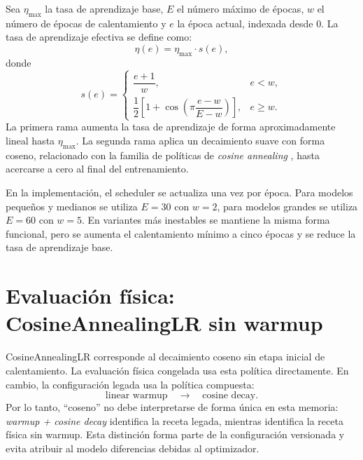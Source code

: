 Sea $\eta_{\max}$ la tasa de aprendizaje base, $E$ el número máximo de épocas, $w$ el número de épocas de calentamiento y $e$ la época actual, indexada desde $0$. La tasa de aprendizaje efectiva se define como:
\begin{equation}
    \eta(e)
    =
    \eta_{\max} \cdot s(e),
\end{equation}
donde
\begin{equation}
    s(e)
    =
    \begin{cases}
        \dfrac{e+1}{w}, & e < w, \\[8pt]
        \dfrac{1}{2}
        \left[
            1 + \cos\left(
                \pi
                \dfrac{e-w}{E-w}
            \right)
        \right],
        & e \geq w.
    \end{cases}
\end{equation}
La primera rama aumenta la tasa de aprendizaje de forma aproximadamente lineal hasta $\eta_{\max}$. La segunda rama aplica un decaimiento suave con forma coseno, relacionado con la familia de políticas de \emph{cosine annealing} \cite{loshchilov2017sgdr}, hasta acercarse a cero al final del entrenamiento.

En la implementación, el scheduler se actualiza una vez por época. Para modelos pequeños y medianos se utiliza $E=30$ con $w=2$, para modelos grandes se utiliza $E=60$ con $w=5$. En variantes más inestables se mantiene la misma forma funcional, pero se aumenta el calentamiento mínimo a cinco épocas y se reduce la tasa de aprendizaje base.

\section{Evaluación física: CosineAnnealingLR sin warmup}
\label{anexo:diferencia-cosine}

CosineAnnealingLR corresponde al decaimiento coseno sin etapa inicial de calentamiento. La evaluación física congelada usa esta política directamente. En cambio, la configuración legada usa la política compuesta:
\[
    \text{linear warmup}
    \quad \longrightarrow \quad
    \text{cosine decay}.
\]
Por lo tanto, ``coseno'' no debe interpretarse de forma única en esta memoria: \emph{warmup + cosine decay} identifica la receta legada, mientras  identifica la receta física sin warmup. Esta distinción forma parte de la configuración versionada y evita atribuir al modelo diferencias debidas al optimizador.

